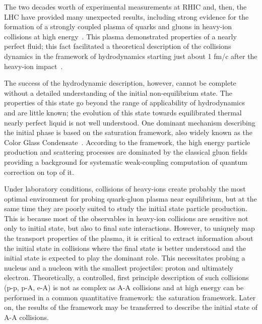 The two decades worth of experimental
measurements at RHIC and, then, the LHC 
have provided many unexpected results, including 
strong evidence for the formation of 
a strongly coupled plasma of quarks and gluons in
heavy-ion collisions at high energy~\cite{Shuryak:2003xe,Shuryak:2004cy,Adams:2005dq,Song:2010mg}. 
This plasma  
demonstrated properties of a nearly perfect fluid; 
this fact facilitated a  theoretical description 
of the collisions dynamics
in the framework of hydrodynamics starting just  
about 1 fm/c after the heavy-ion impact~\cite{Schafer:2009dj,Song:2010mg,Romatschke:2017ejr}.   

The success of the hydrodynamic description, however, cannot be complete 
without a detailed understanding of the initial 
non-equilibrium state. The properties of this state go beyond the range of applicability 
of hydrodynamics and  are little known; 
the evolution of this state towards equilibrated 
thermal nearly perfect liquid  is not well understood. 
One dominant mechanism describing the initial phase is 
based on the saturation framework, also widely known as 
the Color Glass Condensate~\cite{Iancu:2002xk,Albacete:2014fwa,KovchegovLevin}. According to the framework, the 
high energy particle production and scattering processes are 
dominated by the classical gluon fields providing a 
background for systematic weak-coupling 
computation of quantum correction on top of it.  

Under laboratory conditions, 
collisions of heavy-ions create probably the most optimal envi\-ronment for 
probing quark-gluon plasma near equilibrium, but 
at the same time they are poorly suited to study the 
initial state particle production. This is because 
most of the observables in heavy-ion collisions are 
sensitive not only to  initial state, but also 
to  final sate interactions. However, to uniquely map the transport properties 
of the plasma, it is critical to extract information 
about the initial state in collisions where 
the final state is better understood and the 
initial state is expected to play the dominant role.
This necessitates probing a nucleus  and a nucleon with the smallest projectiles: 
proton and ultimately electron. 
Theoretically, a controlled,  first principle description of such collisions (p-p, p-A, e-A) 
is not as complex as A-A collisions 
and at high energy can be performed in a common quantitative framework: the saturation framework. 
Later on, the results of the framework may be transferred to describe the initial state of A-A collisions. 


